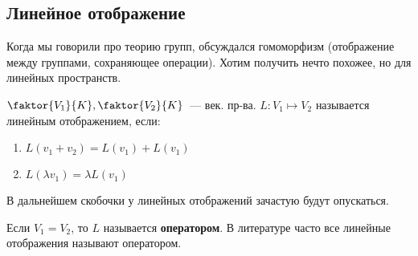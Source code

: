 \subsection{Линейное отображение}
\begin{motivation}
    Когда мы говорили про теорию групп, обсуждался гомоморфизм
    (отображение между группами, сохраняющее операции).
    Хотим получить нечто похожее, но для линейных пространств.
\end{motivation}
\begin{definition}
    $\faktor{V_1}{K},\faktor{V_2}{K}$~--- век. пр-ва. $L: V_1\mapsto V_2$ называется линейным отображением, если:
    \begin{enumerate}
        \item $L(v_1 + v_2) = L(v_1) + L(v_1)$
        \item $L(\lambda v_1) = \lambda L(v_1)$
    \end{enumerate}
\end{definition}
\begin{remark}
    В дальнейшем скобочки у линейных отображений зачастую будут опускаться.
\end{remark}
\begin{definition}
    Если $V_1=V_2$, то $L$ называется \textbf{оператором}.
    \remark В литературе часто все линейные отображения называют оператором.
\end{definition}
